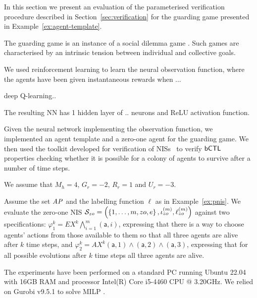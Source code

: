 
In this section we present an evaluation of the parameterised verification
procedure described in Section~\ref{sec:verification} for the guarding game
presented in Example~\ref{ex:agent-template}.


The guarding game is an instance of a social dilemma game
\cite{LeiboZLMG17}. Such games are characterised by an intrinsic tension
between individual and collective goals.

We used reinforcement learning to learn the neural observation function, where
the agents have been given instantaneous rewards when ...

deep Q-learning..

The resulting NN has 1 hidden layer of .. neurons and ReLU activation function.



Given the neural network implementing the observation function, we 
implemented an agent template and a zero-one agent for the guarding game. We
then used the \venmas toolkit developed for verification of
NISs~\cite{Akintunde+20b} to verify $\sf{bCTL}$ properties checking whether it is
possible for a colony of agents to survive after a number of time steps.

We assume that $M_h = 4$, $G_r = -2$, $R_r = 1$ and $U_r = -3$. 

Assume the set $\it{AP}$ and the labelling function $\ell$ as in
Example~\ref{ex:pnis}. We evaluate the zero-one NIS
$\mathcal S_{zo} = \left ( \left \{ 1,\ldots,m,zo,e \right \}, \iota^{({m})}_{zo}, \ell^{(m)}_{zo} \right )$
against two specifications:
$\varphi^k_1 = EX^k \bigwedge_{i=1}^m(\mathsf{a},i)$,
expressing that there is a way to choose agents' actions from those available
to them so that all three agents are alive after $k$ time steps, and
$\varphi^k_2 = AX^k (\mathsf{a},1) \land (\mathsf{a},2) \land (\mathsf{a},3)$,
expressing that for all possible evolutions after $k$ time steps all three
agents are alive.

The experiments have been performed on a standard PC running Ubuntu 22.04 with
16GB RAM and processor Intel(R) Core i5-4460 CPU @ 3.20GHz. We relied on Gurobi
v9.5.1 to solve MILP \cite{Gurobi+16a}.



